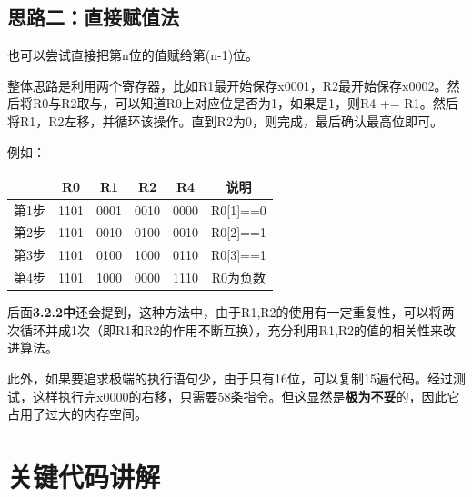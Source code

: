 \documentclass[UTF8]{article}
\newcommand{\jumpLine} {\hspace*{\fill} \par}
\begin{document}
	
	\subsection{思路二：直接赋值法}
	也可以尝试直接把第n位的值赋给第(n-1)位。\par
	整体思路是利用两个寄存器，比如R1最开始保存x0001，R2最开始保存x0002。然后将R0与R2取与，可以知道R0上对应位是否为1，如果是1，则R4 += R1。然后将R1，R2左移，并循环该操作。直到R2为0，则完成，最后确认最高位即可。\par
	例如：\par
	\begin{tabular}{|c|c|c|c|c|c|}
		\hline 
		 & R0 & R1 & R2 & R4 & 说明\\ 
		\hline 
		第1步 & 1101 & 0001 & 0010 & 0000 & R0[1]==0 \\ 
		\hline 
		第2步 & 1101 & 0010 & 0100 & 0010 & R0[2]==1\\ 
		\hline 
		第3步 & 1101 & 0100 & 1000 & 0110 & R0[3]==1\\ 
		\hline 
		第4步 & 1101 & 1000 & 0000 & 1110 & R0为负数\\ 
		\hline 
	\end{tabular} 
	\jumpLine
	\jumpLine
	后面\textbf{3.2.2中}还会提到，这种方法中，由于R1,R2的使用有一定重复性，可以将两次循环并成1次（即R1和R2的作用不断互换），充分利用R1,R2的值的相关性来改进算法。\par
	此外，如果要追求极端的执行语句少，由于只有16位，可以复制15遍代码。经过测试，这样执行完x0000的右移，只需要58条指令。但这显然是\textbf{极为不妥}的，因此它占用了过大的内存空间。
	
	\section{关键代码讲解}
\end{document}
